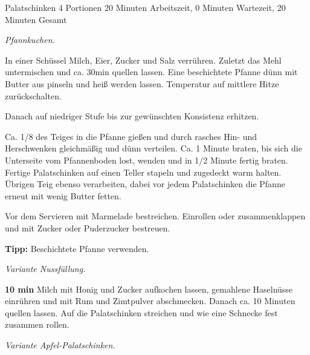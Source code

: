\begin{recipe}{Palatschinken} {4 Portionen} {20 Minuten Arbeitszeit, 0 Minuten Wartezeit, 20 Minuten Gesamt}

  \freeform{}\textit{Pfannkuchen.}


  In einer Schüssel Milch, Eier, Zucker und Salz verrühren.
  Zuletzt das Mehl untermischen und ca. 30min quellen lassen.
  Eine beschichtete Pfanne dünn mit Butter aus pinseln und heiß werden lassen.
  Temperatur auf mittlere Hitze zurückschalten.

  \newstep{}Danach auf niedriger Stufe bis zur gewünschten Konsistenz erhitzen.

  \newstep{}Ca. 1/8 des Teiges in die Pfanne gießen und durch rasches Hin- und Herschwenken gleichmäßig und dünn verteilen.
  Ca. 1 Minute braten, bis sich die Unterseite vom Pfannenboden lost, wenden und in 1/2 Minute fertig braten.
  Fertige Palatschinken auf einen Teller stapeln und zugedeckt warm halten.
  Übrigen Teig ebenso verarbeiten, dabei vor jedem Palatschinken die Pfanne erneut mit wenig Butter fetten.

  \newstep{}Vor dem Servieren mit Marmelade bestreichen.
  Einrollen oder zusammenklappen und mit Zucker oder Puderzucker bestreuen.

  \freeform{}\hrulefill{}

  \freeform{}\textbf{Tipp:}
  Beschichtete Pfanne verwenden.

  \newpage{}

  \freeform{}\hrulefill{}

  \freeform{}\textit{Variante Nussfüllung.}


  \textbf{10 min}
  Milch mit Honig und Zucker aufkochen lassen, gemahlene Haselnüsse einrühren und mit Rum und Zimtpulver abschmecken.
  Danach ca. 10 Minuten quellen lassen.
  Auf die Palatschinken streichen und wie eine Schnecke fest zusammen rollen.

  \freeform{}\hrulefill{}

  \freeform{}\textit{Variante Apfel-Palatschinken.}



\end{recipe}
